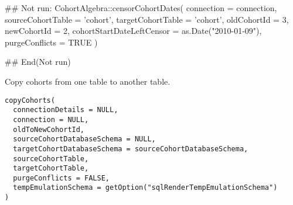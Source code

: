 \documentclass[a4paper]{book}
\begin{document}
%
\begin{Examples}
\begin{ExampleCode}
## Not run: 
CohortAlgebra::censorCohortDates(
  connection = connection,
  sourceCohortTable = 'cohort',
  targetCohortTable = 'cohort',
  oldCohortId = 3,
  newCohortId = 2,
  cohortStartDateLeftCensor = as.Date("2010-01-09"),
  purgeConflicts = TRUE
)

## End(Not run)

\end{ExampleCode}
\end{Examples}
%
\begin{Description}\relax
Copy cohorts from one table to another table.

\strong{[Stable]}
\end{Description}
%
\begin{Usage}
\begin{verbatim}
copyCohorts(
  connectionDetails = NULL,
  connection = NULL,
  oldToNewCohortId,
  sourceCohortDatabaseSchema = NULL,
  targetCohortDatabaseSchema = sourceCohortDatabaseSchema,
  sourceCohortTable,
  targetCohortTable,
  purgeConflicts = FALSE,
  tempEmulationSchema = getOption("sqlRenderTempEmulationSchema")
)
\end{verbatim}
\end{Usage}
%
\end{document}
